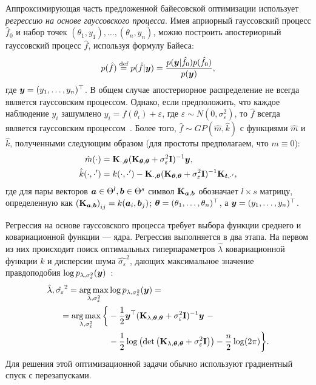 Аппроксимирующая часть предложенной байесовской оптимизации использует \emph{регрессию на основе гауссовского процесса}.
Имея априорный гауссовский процесс $\hat{f}_0$ и набор точек $(\theta_1, y_1), \dots, (\theta_n, y_n)$, можно построить апостериорный гауссовский процесс $\hat{f}$, используя формулу Байеса:
\begin{equation} \label{eqn:bayes}
p(\hat{f})
\stackrel{\text{def}}{=}
p(\hat{f} | \v{y})
=
\frac{p(\v{y} | \hat{f}_0) p(\hat{f}_0)}{p(\v{y})},
\end{equation}
где $\v{y} = (y_1, \ldots, y_n)^{\top}$. В общем случае апостериорное распределение не всегда является гауссовским процессом.
Однако, если предположить, что каждое наблюдение $y_i$ зашумлено $y_i = f(\theta_i) + \varepsilon$, где $\varepsilon \sim N(0, \sigma_{\varepsilon}^2)$, то $\hat{f}$ всегда является гауссовским процессом~\cite{rasmussen2006}.
Более того, $\hat{f} \sim GP(\hat{m}, \hat{k})$ с функциями  $\hat{m}$ и $\hat{k}$, полученными следующим образом (для простоты предполагаем, что $m \equiv 0$):
\begin{align}
\hat{m}(\cdot)
    &= \m{K}_{\cdot,\v{\theta}}(\m{K}_{\v{\theta},\v{\theta}} + \sigma_{\varepsilon}^{2}\m{I})^{-1}\v{y},
\label{eqn:gp_mean}
\\
\hat{k}(\cdot, \cdot')
    &=k(\cdot, \cdot') - \m{K}_{\cdot,\v{\theta}}(\m{K}_{\v{\theta},\v{\theta}} + \sigma_{\varepsilon}^{2}\m{I})^{-1}\m{K}_{\v{t}, \cdot'},
\label{eqn:gp_var}
\end{align}
где для пары векторов $\v{a} \in \Theta^l, \v{b} \in \Theta^s$ символ $\m{K}_{\v{a}, \v{b}}$ обозначает $l \times s$ матрицу, определенную как $\left(\m{K}_{\v{a}, \v{b}}\right)_{i j} = k(\v{a}_i, \v{b}_j)$; $\v{\theta} = (\theta_1, \ldots, \theta_n)^{\top}$, а $\v{y} = (y_1, \ldots, y_n)^{\top}$.

Регрессия на основе гауссовского процесса требует выбора функции среднего и ковариационной функции --- ядра.
Регрессия выполняется в два этапа.
На первом из них происходит поиск оптимальных гиперпараметров $\hat{\lambda}$ ковариационной функции $k$ и дисперсии шума $\hat{\sigma_{\varepsilon}}^2$, дающих максимальное значение правдоподобия $\log p_{\lambda, \sigma_{\varepsilon}^2}(\v{y})$~\cite{rasmussen2006}:
\[
\begin{split}
\hat{\lambda}, \hat{\sigma_{\varepsilon}}^2
=
\argmax_{\lambda, \sigma_{\varepsilon}^2}
&\log p_{\lambda, \sigma_{\varepsilon}^2}(\v{y}) =
\\
=
\argmax_{\lambda, \sigma_{\varepsilon}^2}
\bigg\{&-\frac{1}{2}\v{y}^{\top}(\m{K}_{\lambda, \v{\theta}, \v{\theta}} + \sigma_{\varepsilon}^2 \m{I})^{-1} \v{y}
\ - \\
&-\frac{1}{2}\log\left(\det\left(\m{K}_{\lambda, \v{\theta}, \v{\theta}} + \sigma_{\varepsilon}^2 \m{I}\right)\right)
-\frac{n}{2}\log(2\pi)\bigg\}.
\end{split}
\]
Для решения этой оптимизационной задачи обычно используют градиентный спуск с перезапусками.


